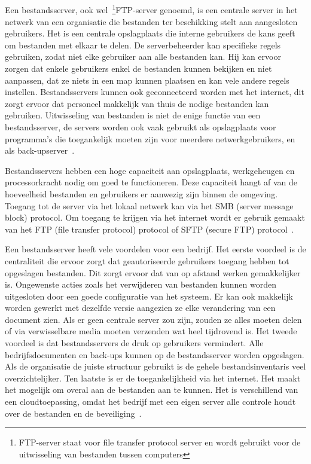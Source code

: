 \subsection{}
\label{subsec:ITcomponenten}
\subsubsection{}
\label{subsubsec:Bestandsserver}
Een bestandsserver, ook wel~\footnote{FTP-server staat voor file transfer protocol server en wordt gebruikt voor de uitwisseling van bestanden tussen computers}FTP-server genoemd, is een centrale server in het netwerk van een organisatie die bestanden ter beschikking stelt aan aangesloten gebruikers. Het is een centrale opslagplaats die interne gebruikers de kans geeft om bestanden met elkaar te delen. De serverbeheerder kan specifieke regels gebruiken, zodat niet elke gebruiker aan alle bestanden kan. Hij kan ervoor zorgen dat enkele gebruikers enkel de bestanden kunnen bekijken en niet aanpassen, dat ze niets in een map kunnen plaatsen en kan vele andere regels instellen. Bestandsservers kunnen ook geconnecteerd worden met het internet, dit zorgt ervoor dat personeel makkelijk van thuis de nodige bestanden kan gebruiken. Uitwisseling van bestanden is niet de enige functie van een bestandsserver, de servers worden ook vaak gebruikt als opslagplaats voor programma's die toegankelijk moeten zijn voor meerdere netwerkgebruikers, en als back-upserver~\autocite{Ionos2019}.

Bestandsservers hebben een hoge capaciteit aan opslagplaats, werkgeheugen en processorkracht nodig om goed te functioneren. Deze capaciteit hangt af van de hoeveelheid bestanden en gebruikers er aanwezig zijn binnen de omgeving. Toegang tot de server via het lokaal netwerk kan via het SMB (server message block) protocol. Om toegang te krijgen via het internet wordt er gebruik gemaakt van het FTP (file transfer protocol) protocol of SFTP (secure FTP) protocol~\autocite{Ionos2019}.

Een bestandsserver heeft vele voordelen voor een bedrijf. Het eerste voordeel is de centraliteit die ervoor zorgt dat geautoriseerde gebruikers toegang hebben tot opgeslagen bestanden. Dit zorgt ervoor dat van op afstand werken gemakkelijker is. Ongewenste acties zoals het verwijderen van bestanden kunnen worden uitgesloten door een goede configuratie van het systeem. Er kan ook makkelijk worden gewerkt met dezelfde versie aangezien ze elke verandering van een document zien. Als er geen centrale server zou zijn, zouden ze alles moeten delen of via verwisselbare media moeten verzenden wat heel tijdrovend is. Het tweede voordeel is dat bestandsservers de druk op gebruikers vermindert. Alle bedrijfsdocumenten en back-ups kunnen op de bestandsserver worden opgeslagen. Als de organisatie de juiste structuur gebruikt is de gehele bestandsinventaris veel overzichtelijker. Ten laatste is er de toegankelijkheid via het internet. Het maakt het mogelijk om overal aan de bestanden aan te kunnen. Het is verschillend van een cloudtoepassing, omdat het bedrijf met een eigen server alle controle houdt over de bestanden en de beveiliging~\autocite{Ionos2019}.

